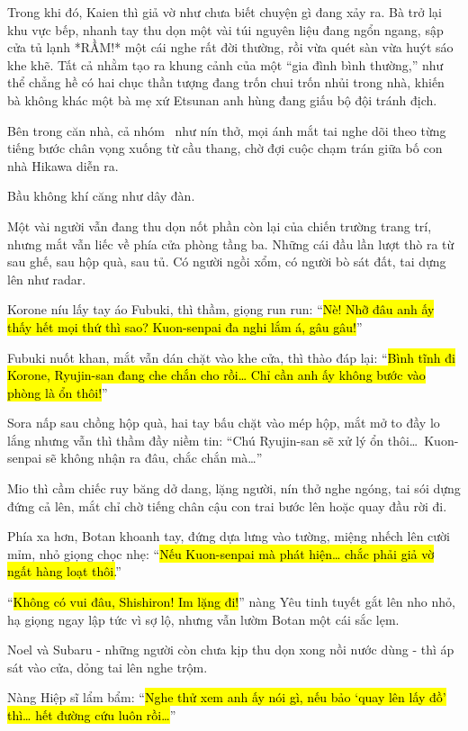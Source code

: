 \documentclass[../main.tex]{subfiles}
\begin{document}
Trong khi đó, Kaien thì giả vờ như chưa biết chuyện gì đang xảy ra. Bà trở lại khu vực bếp, nhanh tay thu dọn một vài túi nguyên liệu đang ngổn ngang, sập cửa tủ lạnh *RẦM!* một cái nghe rất đời thường, rồi vừa quét sàn vừa huýt sáo khe khẽ. Tất cả nhằm tạo ra khung cảnh của một ``gia đình bình thường,'' như thể chẳng hề có hai chục thần tượng đang trốn chui trốn nhủi trong nhà, khiến bà không khác một bà mẹ xứ Etsunan anh hùng đang giấu bộ đội tránh địch.

Bên trong căn nhà, cả nhóm \hll\ như nín thở, mọi ánh mắt tai nghe dõi theo từng tiếng bước chân vọng xuống từ cầu thang, chờ đợi cuộc chạm trán giữa bố con nhà Hikawa diễn ra.

Bầu không khí căng như dây đàn.

Một vài người vẫn đang thu dọn nốt phần còn lại của chiến trường trang trí, nhưng mắt vẫn liếc về phía cửa phòng tầng ba. Những cái đầu lần lượt thò ra từ sau ghế, sau hộp quà, sau tủ. Có người ngồi xổm, có người bò sát đất, tai dựng lên như radar.

Korone níu lấy tay áo Fubuki, thì thầm, giọng run run: ``\hl{Nè! Nhỡ đâu anh ấy thấy hết mọi thứ thì sao? Kuon-senpai đa nghi lắm á, gâu gâu!}''

Fubuki nuốt khan, mắt vẫn dán chặt vào khe cửa, thì thào đáp lại: ``\hl{Bình tĩnh đi Korone, Ryujin-san đang che chắn cho rồi\dots{} Chỉ cần anh ấy không bước vào phòng là ổn thôi!}''

Sora nấp sau chồng hộp quà, hai tay bấu chặt vào mép hộp, mắt mở to đầy lo lắng nhưng vẫn thì thầm đầy niềm tin: ``Chú Ryujin-san sẽ xử lý ổn thôi\dots\ Kuon-senpai sẽ không nhận ra đâu, chắc chắn mà\dots''

Mio thì cầm chiếc ruy băng dở dang, lặng người, nín thở nghe ngóng, tai sói dựng đứng cả lên, mắt chỉ chờ tiếng chân cậu con trai bước lên hoặc quay đầu rời đi.

Phía xa hơn, Botan khoanh tay, đứng dựa lưng vào tường, miệng nhếch lên cười mỉm, nhỏ giọng chọc nhẹ: ``\hl{Nếu Kuon-senpai mà phát hiện\dots{} chắc phải giả vờ ngất hàng loạt thôi.}''

``\hl{Không có vui đâu, Shishiron! Im lặng đi!}'' nàng Yêu tinh tuyết gắt lên nho nhỏ, hạ giọng ngay lập tức vì sợ lộ, nhưng vẫn lườm Botan một cái sắc lẹm.

Noel và Subaru - những người còn chưa kịp thu dọn xong nồi nước dùng - thì áp sát vào cửa, dỏng tai lên nghe trộm.

Nàng Hiệp sĩ lẩm bẩm: ``\hl{Nghe thử xem anh ấy nói gì, nếu bảo `quay lên lấy đồ' thì\dots{} hết đường cứu luôn rồi\dots}''
\end{document}
